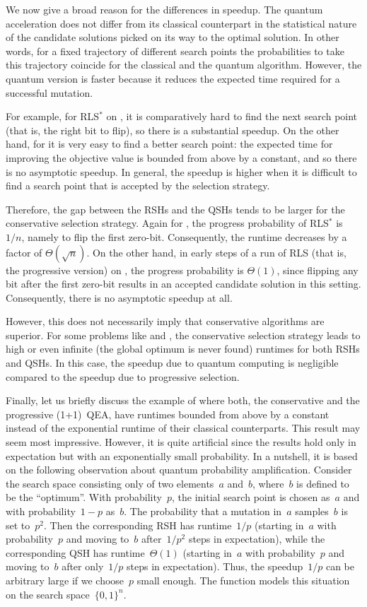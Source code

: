 \documentclass[a4paper,11pt]{article}
\begin{document}
We now give a broad reason for the differences in speedup. The quantum acceleration does not differ from its classical counterpart in the statistical nature of the candidate solutions picked on its way to the optimal solution. In other words, for a fixed trajectory of different search points the probabilities to take this trajectory coincide for the classical and the quantum algorithm. However, the quantum version is faster because it reduces the expected time required for a successful mutation.

For example, for RLS$^*$ on \leadingones, it is comparatively hard to find the next search point (that is, the right bit to flip), so there is a substantial speedup. On the other hand, for \discrepancy it is very easy to find a better search point: the expected time for improving the objective value is bounded from above by a constant, and so there is no asymptotic speedup. In general, the speedup is higher when it is difficult to find a search point that is accepted by the selection strategy. 

Therefore, the gap between the RSHs and the QSHs tends to be larger for the conservative selection strategy. Again for \leadingones, the progress probability of RLS$^*$ is~$1/n$, namely to flip the first zero-bit. Consequently, the runtime decreases by a factor of  $\Theta(\sqrt{n})$. On the other hand, in early steps of a run of RLS (that is, the progressive version) on \leadingones, the progress probability is $\Theta(1)$, since flipping any bit after the first zero-bit results in an accepted candidate solution in this setting. Consequently, there is no asymptotic speedup at all. 

However, this does not necessarily imply that conservative algorithms are superior. For some problems like \needle and \jumpm, the conservative selection strategy leads to high or even infinite (the global optimum is never found) runtimes for both RSHs and QSHs. In this case, the speedup due to quantum computing is negligible compared to the speedup due to progressive selection.

Finally, let us briefly discuss the example of \tinytrap where both, the conservative and the progressive (1+1)~QEA, have runtimes bounded from above by a constant instead of the exponential runtime of their classical counterparts. This result may seem most impressive. However, it is quite artificial since the results hold only in expectation but with an exponentially small probability. In a nutshell, it is based on the following observation about quantum probability amplification. Consider the search space consisting only of two elements~$a$ and~$b$, where~$b$ is defined to be the ``optimum''. With probability~$p$, the initial search point is chosen as~$a$ and with probability~$1-p$ as~$b$. The probability that a mutation in~$a$ samples~$b$ is set to~$p^2$. Then the corresponding RSH has runtime~$1/p$ (starting in~$a$ with probability~$p$ and moving to~$b$ after~$1/p^2$ steps in expectation), while the corresponding QSH has runtime~$\Theta(1)$ (starting in~$a$ with probability~$p$ and moving to~$b$ after only~$1/p$ steps in expectation). Thus, the speedup~$1/p$ can be arbitrary large if we choose~$p$ small enough. The function \tinytrap models this situation on the search space~$\{0,1\}^n$.
\end{document}
